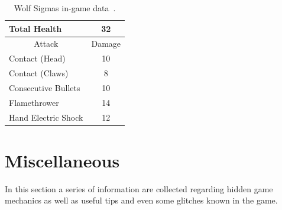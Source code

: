 \begin{table}[htp]
	\centering
	\begin{tabular}[h]{l c}
		\toprule
		Total Health  & 32\\
		\midrule
		\multicolumn{1}{c}{Attack} & \multicolumn{1}{c}{Damage}\\
		Contact (Head) & 10\\
		Contact (Claws) & 8\\
		Consecutive Bullets & 10\\
		Flamethrower & 14\\
		Hand Electric Shock& 12\\
		\bottomrule
	\end{tabular}
	\caption{Wolf Sigmas in-game data~\cite{wiki:Sigma,book:Compendium}.}
\end{table}

\chapter{Miscellaneous}\label{X1:misc} %
In this section a series of information are collected regarding hidden game mechanics as well as useful tips and even some glitches known in the game.

